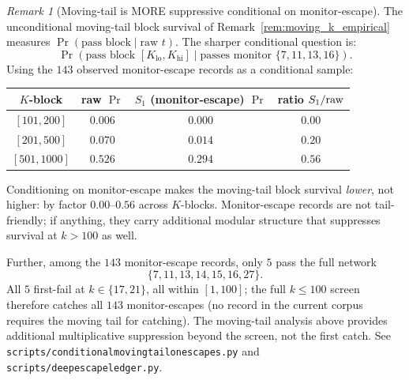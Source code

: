 \documentclass[11pt]{article}
\renewcommand{\_}{\origunderscore\allowbreak}
\theoremstyle{definition}
\theoremstyle{remark}
\newtheorem{remark}[theorem]{Remark}
\begin{document}
\begin{remark}[Moving-tail is MORE suppressive conditional on monitor-escape]\label{rem:conditional_tail}
The unconditional moving-tail block survival of
Remark~\ref{rem:moving_k_empirical} measures
$\Pr(\text{pass block}\mid\text{raw } t)$.  The sharper conditional
question is:
\[
  \Pr(\text{pass block }[K_{\text{lo}}, K_{\text{hi}}]\mid \text{passes monitor }\{7,11,13,16\}).
\]
Using the $143$ observed monitor-escape records as a conditional
sample:

\begin{center}
\begin{tabular}{c|ccc}
\hline
$K$-block & raw $\Pr$ & $S_1$ (monitor-escape) $\Pr$ & ratio $S_1/{\rm raw}$ \\
\hline
$[101, 200]$  & $0.006$ & $0.000$ & $0.00$ \\
$[201, 500]$  & $0.070$ & $0.014$ & $0.20$ \\
$[501, 1000]$ & $0.526$ & $0.294$ & $0.56$ \\
\hline
\end{tabular}
\end{center}

\noindent Conditioning on monitor-escape makes the moving-tail block
survival \emph{lower}, not higher: by factor $0.00$--$0.56$ across
$K$-blocks.  Monitor-escape records are not tail-friendly; if anything,
they carry additional modular structure that suppresses survival at
$k>100$ as well.

Further, among the $143$ monitor-escape records, only $5$ pass the
full network
\[
  \{7,11,13,14,15,16,27\}.
\]
All $5$ first-fail at
$k\in\{17, 21\}$, all within $[1, 100]$; the full $k\le 100$ screen
therefore catches all $143$ monitor-escapes (no record in the
current corpus requires the moving tail for catching).  The
moving-tail analysis above provides additional multiplicative
suppression beyond the screen, not the first catch.  See
\texttt{scripts/conditional\_moving\_tail\_on\_escapes.py} and
\texttt{scripts/deep\_escape\_ledger.py}.
\end{remark}
\end{document}
